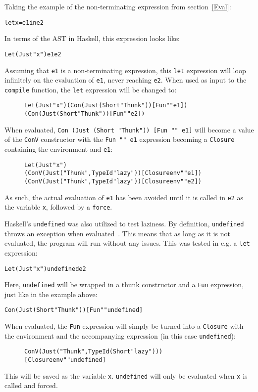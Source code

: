 Taking the example of the non-terminating expression from section~\ref{Eval}:
\begin{alltt}
  let x = e1 in e2
\end{alltt}
In terms of the AST in Haskell, this expression looks like:
\begin{alltt}
  Let (Just "x") e1 e2
\end{alltt}
Assuming that \texttt{e1} is a non-terminating expression, this \texttt{let}
expression will loop infinitely on the evaluation of \texttt{e1}, never reaching
\texttt{e2}. When used as input to the \texttt{compile} function, the
\texttt{let} expression will be changed to:
\begin{figure}[!ht]
\begin{alltt}
  Let (Just "x") (Con (Just (Short "Thunk")) [Fun "" e1])
                 (Con (Just (Short "Thunk")) [Fun "" e2])
\end{alltt}
\end{figure}

\noindent When evaluated, \texttt{Con (Just (Short "Thunk")) [Fun "" e1]} will
become a value of the \texttt{ConV} constructor with the \texttt{Fun "" e1}
expression becoming a \texttt{Closure} containing the environment and
\texttt{e1}:
\begin{figure}[!ht]
\begin{alltt}
  Let (Just "x")
    (ConV (Just ("Thunk",TypeId "lazy")) [Closure env "" e1])
    (ConV (Just ("Thunk",TypeId "lazy")) [Closure env "" e2])
\end{alltt}
\end{figure}

\noindent As such, the actual evaluation of \texttt{e1} has been avoided
until it is called in \texttt{e2} as the variable \texttt{x}, followed by a
\texttt{force}.

Haskell's \texttt{undefined} was also utilized to test laziness. By definition,
\texttt{undefined} throws an exception when evaluated~\cite{Undefine63:online}.
This means that as long as it is not evaluated, the program will run without
any issues. This was tested in e.g. a \texttt{let} expression:
\begin{alltt}
  Let (Just "x") undefined e2
\end{alltt}
Here, \texttt{undefined} will be wrapped in a thunk constructor and a
\texttt{Fun} expression, just like in the example above:
\begin{alltt}
  Con (Just (Short "Thunk")) [Fun "" undefined]
\end{alltt}
When evaluated, the
\texttt{Fun} expression will simply be turned into a \texttt{Closure} with the
environment and the accompanying expression (in this case \texttt{undefined}):
\begin{figure}[!ht]
\begin{alltt}
  ConV (Just ("Thunk",TypeId (Short "lazy")))
    [Closure env "" undefined]
\end{alltt}
\end{figure}

\noindent This will be saved as the variable \texttt{x}. \texttt{undefined} will
only be evaluated when \texttt{x} is called and forced.
